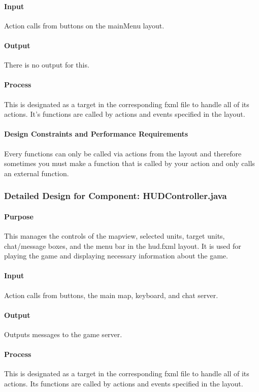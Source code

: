 \documentclass[12pt,a4paper,titlepage]{article}
\begin{document}
\paragraph{Input} Action calls from buttons on the mainMenu layout.
\paragraph{Output} There is no output for this.
\paragraph{Process} This is designated as a target in the corresponding fxml file to handle all of its actions.  It’s functions are called by actions and events specified in the layout.
\paragraph{Design Constraints and Performance Requirements}	 Every functions can only be called via actions from the layout and therefore sometimes you must make a function that  is called by your action and only calls an external function.

\subsubsection{Detailed Design for Component: HUDController.java}
\paragraph{Purpose} This manages the controls of the mapview, selected units, target units, chat/message boxes, and the menu bar in the hud.fxml layout.  It is used for playing the game and displaying necessary information about the game.
\paragraph{Input} Action calls from buttons, the main map, keyboard, and chat server.
\paragraph{Output} Outputs messages to the game server.
\paragraph{Process} This is designated as a target in the corresponding fxml file to handle all of its actions.  Its functions are called by actions and events specified in the layout.
\end{document}
